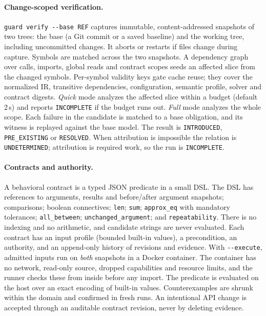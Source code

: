 \documentclass[10pt,twocolumn]{article}
\newcommand{\opt}[1]{\texttt{-{}-#1}}
\newcommand{\res}[1]{\texttt{\small #1}}
\begin{document}
\paragraph{Change-scoped verification.}
\texttt{guard verify -{}-base REF} captures immutable, content-addressed snapshots of two trees: the base (a Git commit or
a saved baseline) and the working tree, including uncommitted changes. It aborts or restarts if files change during
capture. Symbols are matched across the two snapshots. A dependency graph over calls, imports, global reads and contract
scopes seeds an affected slice from the changed symbols. Per-symbol validity keys gate cache reuse; they cover the
normalized IR, transitive dependencies, configuration, semantic profile, solver and contract digests. \emph{Quick} mode
analyzes the affected slice within a budget (default 2\,s) and reports \res{INCOMPLETE} if the budget runs out.
\emph{Full} mode analyzes the whole scope. Each failure in the candidate is matched to a base obligation, and its
witness is replayed against the base model. The result is \res{INTRODUCED}, \res{PRE\_EXISTING} or \res{RESOLVED}. When
attribution is impossible the relation is \res{UNDETERMINED}; attribution is required work, so the run is
\res{INCOMPLETE}.

\paragraph{Contracts and authority.}
A behavioral contract is a typed JSON predicate in a small DSL. The DSL has references to arguments, results and
before/after argument snapshots; comparisons; boolean connectives; \texttt{len}; \texttt{sum}; \texttt{approx\_eq} with
mandatory tolerances; \texttt{all\_between}; \texttt{unchanged\_argument}; and \texttt{repeatability}. There is no
indexing and no arithmetic, and candidate strings are never evaluated. Each contract has an input profile (bounded
built-in values), a precondition, an authority, and an append-only history of revisions and evidence. With
\opt{execute}, admitted inputs run on \emph{both} snapshots in a Docker container. The container has no network,
read-only source, dropped capabilities and resource limits, and the runner checks these from inside before any import.
The predicate is evaluated on the host over an exact encoding of built-in values. Counterexamples are shrunk within the
domain and confirmed in fresh runs. An intentional API change is accepted through an auditable contract revision, never
by deleting evidence.
\end{document}
